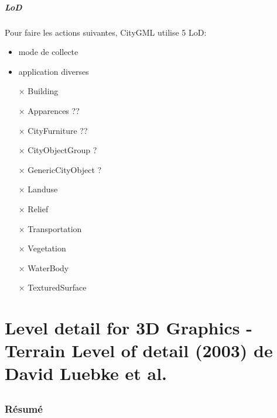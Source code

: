 \documentclass[11pt]{report}
\begin{document}
\subsubsection{LoD}

Pour faire les actions suivantes, CityGML utilise 5 LoD:
\begin{itemize}
	\item mode de collecte
	\item application diverses
\end{itemize}

\begin{itemize}
\item [$\times$] Building
\item [$\times$] Apparences ??
\item [$\times$] CityFurniture ??
\item [$\times$] CityObjectGroup ?
\item [$\times$] GenericCityObject ?
\item [$\times$] Landuse
\item [$\times$] Relief
\item [$\times$] Transportation
\item [$\times$] Vegetation
\item [$\times$] WaterBody
\item [$\times$] TexturedSurface
\end{itemize}



\part{Level detail for 3D Graphics - Terrain Level of detail (2003) de David Luebke et al.}

\chapter*{}

\section*{Résumé}
\end{document}
